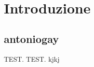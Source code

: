 \chapter{Introduzione}
\label{chap:introduction}
\section{antoniogay}
\label{sect:gay}
TEST.
TEST.
kjkj
